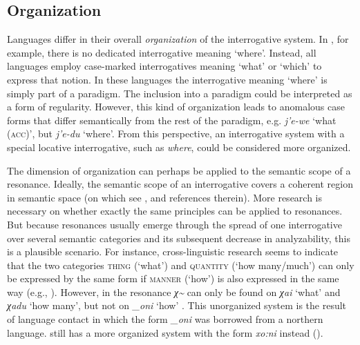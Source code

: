 \documentclass[output=paper,hidelinks]{langscibook}
\begin{document}
\subsection{Organization}
Languages differ in their overall \textit{organization} of the interrogative system. In , for example, there is no dedicated interrogative meaning `where'. Instead, all languages employ case-marked interrogatives meaning `what' or `which' to express that notion. In these languages the interrogative meaning `where' is simply part of a paradigm. The inclusion into a paradigm could be interpreted as a form of regularity. However, this kind of organization leads to anomalous case forms that differ semantically from the rest of the paradigm, e.g.  \textit{j'e-we} `what (\textsc{acc})', but \textit{j'e-du} `where'. From this perspective, an interrogative system with a special locative interrogative, such as  \textit{where}, could be considered more organized.

The dimension of organization can perhaps be applied to the semantic scope of a resonance. Ideally, the semantic scope of an interrogative covers a coherent region in semantic space (on which see \citealt{Cysouw2005,Cysouw2007}, \citealt[82f.]{Hölzl2018b} and references therein). More research is necessary on whether exactly the same principles can be applied to resonances. But because resonances usually emerge through the spread of one interrogative over several semantic categories and its subsequent decrease in analyzability, this is a plausible scenario. For instance, cross-linguistic research seems to indicate that the two categories \textsc{thing} (`what') and \textsc{quantity} (`how many/much') can only be expressed by the same form if \textsc{manner} (`how') is also expressed in the same way (e.g., \citealt{Cysouw2005}). However, in  the resonance \textit{χ\textasciitilde} can only be found on \textit{χai} `what' and \textit{χadu} `how many', but not on \textit{\_oni} `how' \citep{AnJun1986}. This unorganized system is the result of language contact in which the form \textit{\_oni} was borrowed from a northern  language.  still has a more organized system with the form \textit{xo:ni} instead ().

\end{document}
